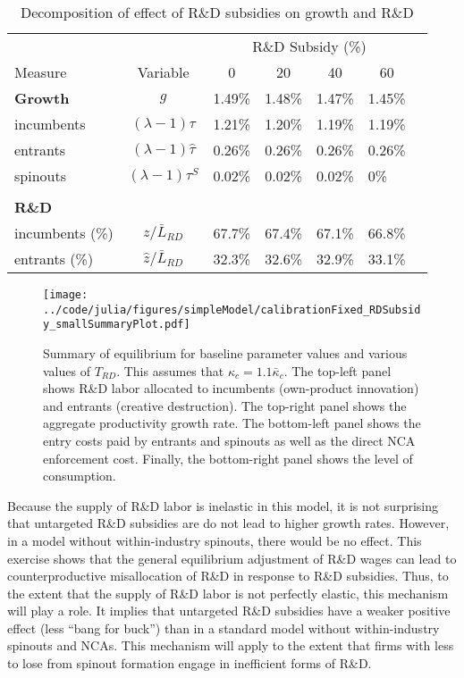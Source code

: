 \documentclass[11pt,english]{article}
\theoremstyle{definition}
\begin{document}
\begin{table}
	\centering
	\caption{Decomposition of effect of R\&D subsidies on growth and R\&D}\label{rdsubsidy_table_decomposition}
	\begin{tabular}{lclllll}
		\toprule \toprule
		&  & \multicolumn{4}{c}{R\&D Subsidy (\%)} \vspace{3pt} \tabularnewline
		Measure &Variable & \multicolumn{1}{c}{0} & \multicolumn{1}{c}{20} & \multicolumn{1}{c}{40} & \multicolumn{1}{c}{60} \tabularnewline
		\midrule
		\textbf{Growth} & $g$ & 1.49\% & 1.48\% & 1.47\% & 1.45\% \tabularnewline
		\multicolumn{1}{l}{\quad incumbents} & $(\lambda-1)\tau$ & 1.21\% & 1.20\% & 1.19\% & 1.19\% \tabularnewline
		\multicolumn{1}{l}{\quad entrants} &$(\lambda-1)\hat{\tau}$ & 0.26\% & 0.26\% & 0.26\% & 0.26\% \tabularnewline
		\multicolumn{1}{l}{\quad spinouts} & $(\lambda -1)\tau^S$ & 0.02\% & 0.02\% & 0.02\% & 0\% \tabularnewline
		\tabularnewline
		\textbf{R\&D} & &  &  &  & \tabularnewline 
		\multicolumn{1}{l}{\quad incumbents (\%)} & $z / \bar{L}_{RD}$ & 67.7\% & 67.4\% & 67.1\% & 66.8\% \tabularnewline
		\multicolumn{1}{l}{\quad entrants (\%)} & $\hat{z} / \bar{L}_{RD}$ & 32.3\% & 32.6\% & 32.9\% & 33.1\% \tabularnewline
		\bottomrule
	\end{tabular}
\end{table}


\begin{figure}[]
	\centering
	\texttt{[image: ../code/julia/figures/simpleModel/calibrationFixed\_RDSubsidy\_smallSummaryPlot.pdf]}
	\caption{Summary of equilibrium for baseline parameter values and various values of $T_{RD}$. This assumes that $\kappa_c = 1.1 \bar{\kappa}_c$. The top-left panel shows R\&D labor allocated to incumbents (own-product innovation) and entrants (creative destruction). The top-right panel shows the aggregate productivity growth rate. The bottom-left panel shows the entry costs paid by entrants and spinouts as well as the direct NCA enforcement cost. Finally, the bottom-right panel shows the level of consumption.}
	\label{calibration_RDSubsidy_smallSummaryPlot}
\end{figure}

Because the supply of R\&D labor is inelastic in this model, it is not surprising that untargeted R\&D subsidies are do not lead to higher growth rates. However, in a model without within-industry spinouts, there would be no effect. This exercise shows that the general equilibrium adjustment of R\&D wages can lead to counterproductive misallocation of R\&D in response to R\&D subsidies. Thus, to the extent that the supply of R\&D labor is not perfectly elastic, this mechanism will play a role. It implies that untargeted R\&D subsidies have a weaker positive effect (less ``bang for buck'') than in a standard model without within-industry spinouts and NCAs. This mechanism will apply to the extent that firms with less to lose from spinout formation engage in inefficient forms of R\&D.
\end{document}
